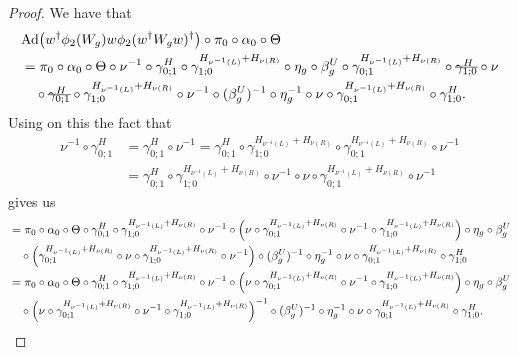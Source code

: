 \documentclass[12pt,a4paper,twoside]{article}
\newcommand{\stkout}[1]{\ifmmode\text{\sout{\ensuremath{#1}}}\else\sout{#1}\fi}
\let\originalleft\left
\let\originalright\right
\renewcommand{\left}{\mathopen{}\mathclose\bgroup\originalleft}
\renewcommand{\right}{\aftergroup\egroup\originalright}
\newcommand{\Ad}[1]{\textrm{Ad}\left(#1\right)}
\theoremstyle{definition}
\numberwithin{equation}{section}
\begin{document}
\begin{proof}
	We have that
	\begin{align}
		&\Ad{w^\dagger \phi_2(W_g)w\phi_2(w^\dagger W_g w)^\dagger}\circ\pi_0\circ\alpha_0\circ\Theta\\
		&=\pi_0\circ\alpha_0\circ\Theta\circ\nu^{-1}\circ\gamma^H_{0;1}\circ\gamma^{H_{\nu^{-1}(L)}+H_{\nu(R)}}_{1;0}\circ\eta_g\circ\beta_g^U\circ\gamma^{H_{\nu^{-1}(L)}+H_{\nu(R)}}_{0;1}\circ\stkout{\gamma^H_{1;0}}\circ\nu\\
		\nonumber
		&\quad \circ\stkout{\gamma^H_{0;1}}\circ\gamma^{H_{\nu^{-1}(L)}+H_{\nu(R)}}_{1;0}\circ\nu^{-1}\circ(\beta_g^U)^{-1}\circ\eta_g^{-1}\circ\nu\circ\gamma^{H_{\nu^{-1}(L)}+H_{\nu(R)}}_{0;1}\circ\gamma^H_{1;0}.
	\end{align}
	Using on this the fact that
	\begin{align}
		\nu^{-1}\circ\gamma^H_{0;1}&=\gamma^H_{0;1}\circ\nu^{-1}=\gamma^H_{0;1}\circ\gamma^{H_{\nu^{-1}(L)}+H_{\nu(R)}}_{1;0}\circ\gamma^{H_{\nu^{-1}(L)}+H_{\nu(R)}}_{0;1}\circ\nu^{-1}\\
		&=\gamma^H_{0;1}\circ\gamma^{H_{\nu^{-1}(L)}+H_{\nu(R)}}_{1;0}\circ\nu^{-1}\circ\nu\circ\gamma^{H_{\nu^{-1}(L)}+H_{\nu(R)}}_{0;1}\circ\nu^{-1}
	\end{align}
	gives us
	\begin{align}
		&=\pi_0\circ\alpha_0\circ\Theta\circ\gamma^H_{0;1}\circ\gamma^{H_{\nu^{-1}(L)}+H_{\nu(R)}}_{1;0}\circ\nu^{-1}\circ\left(\nu\circ\gamma^{H_{\nu^{-1}(L)}+H_{\nu(R)}}_{0;1}\circ\nu^{-1}\circ\gamma^{H_{\nu^{-1}(L)}+H_{\nu(R)}}_{1;0}\right)\circ\eta_g\circ\beta_g^U\\
		\nonumber
		&\quad \circ\left(\gamma^{H_{\nu^{-1}(L)}+H_{\nu(R)}}_{0;1}\circ\nu\circ\gamma^{H_{\nu^{-1}(L)}+H_{\nu(R)}}_{1;0}\circ\nu^{-1}\right)\circ(\beta_g^U)^{-1}\circ\eta_g^{-1}\circ\nu\circ\gamma^{H_{\nu^{-1}(L)}+H_{\nu(R)}}_{0;1}\circ\gamma^H_{1;0}\\
		\label{eq:ExistenceOfEpsilonProofEquationOne}
		&=\pi_0\circ\alpha_0\circ\Theta\circ\gamma^H_{0;1}\circ\gamma^{H_{\nu^{-1}(L)}+H_{\nu(R)}}_{1;0}\circ\nu^{-1}\circ\left(\nu\circ\gamma^{H_{\nu^{-1}(L)}+H_{\nu(R)}}_{0;1}\circ\nu^{-1}\circ\gamma^{H_{\nu^{-1}(L)}+H_{\nu(R)}}_{1;0}\right)\circ\eta_g\circ\beta_g^U\\
		\nonumber
		&\quad \circ\left(\nu\circ\gamma^{H_{\nu^{-1}(L)}+H_{\nu(R)}}_{0;1}\circ\nu^{-1}\circ\gamma^{H_{\nu^{-1}(L)}+H_{\nu(R)}}_{1;0}\right)^{-1}\circ(\beta_g^U)^{-1}\circ\eta_g^{-1}\circ\nu\circ\gamma^{H_{\nu^{-1}(L)}+H_{\nu(R)}}_{0;1}\circ\gamma^H_{1;0}.
	\end{align}

\end{proof}
\end{document}
